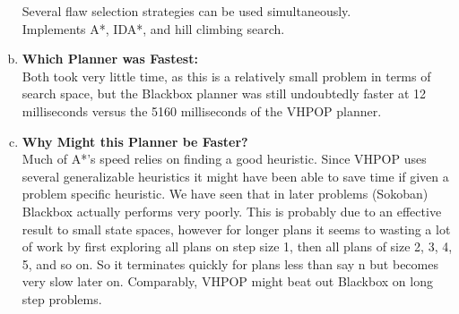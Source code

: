\documentclass[]{article}
\begin{document}
\begin{enumerate}[(a)]
		 Several flaw selection strategies can be used simultaneously.\\
		 
		 Implements A*, IDA*, and hill climbing search.\\
		
	\item \textbf{Which Planner was Fastest:}\\
	Both took very little time, as this is a relatively small problem in terms of search space, but  the Blackbox planner was still undoubtedly faster at 12 milliseconds versus the 5160 milliseconds of the VHPOP planner. 
	
	\item \textbf{Why Might this Planner be Faster?}\\ 
	Much of A*'s speed relies on finding a good heuristic. Since VHPOP uses several generalizable heuristics it might have been able to save time if given a problem specific heuristic. We have seen that in later problems (Sokoban) Blackbox actually performs very poorly. This is probably due to an effective result to small state spaces, however for longer plans it seems to wasting a lot of work by first exploring all plans on step size 1, then all plans of size 2, 3, 4, 5, and so on. So it terminates quickly for plans less than say n but becomes very slow later on. Comparably, VHPOP might beat out Blackbox on long step problems.
	
	\end{enumerate}
\end{document}
